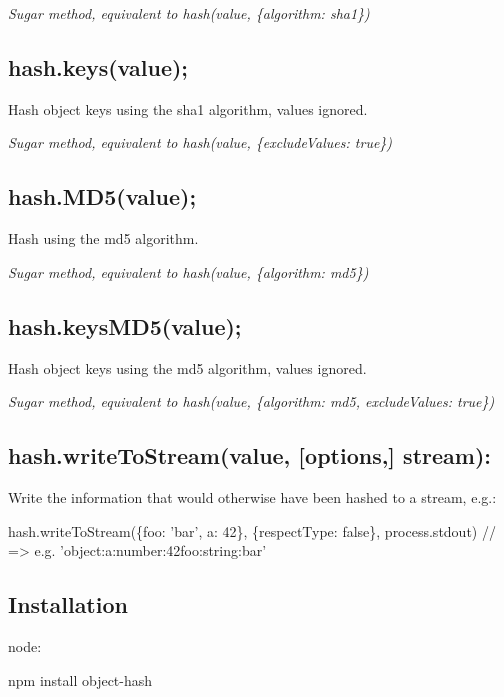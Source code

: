 {\itshape Sugar method, equivalent to hash(value, \{algorithm\+: \textquotesingle{}sha1\textquotesingle{}\})}

\subsection*{hash.\+keys(value);}

Hash object keys using the sha1 algorithm, values ignored.

{\itshape Sugar method, equivalent to hash(value, \{exclude\+Values\+: true\})}

\subsection*{hash.\+M\+D5(value);}

Hash using the md5 algorithm.

{\itshape Sugar method, equivalent to hash(value, \{algorithm\+: \textquotesingle{}md5\textquotesingle{}\})}

\subsection*{hash.\+keys\+M\+D5(value);}

Hash object keys using the md5 algorithm, values ignored.

{\itshape Sugar method, equivalent to hash(value, \{algorithm\+: \textquotesingle{}md5\textquotesingle{}, exclude\+Values\+: true\})}

\subsection*{hash.\+write\+To\+Stream(value, \mbox{[}options,\mbox{]} stream)\+:}

Write the information that would otherwise have been hashed to a stream, e.\+g.\+: 
\begin{DoxyCode}
hash.writeToStream(\{foo: 'bar', a: 42\}, \{respectType: false\}, process.stdout)
// => e.g. 'object:a:number:42foo:string:bar'
\end{DoxyCode}


\subsection*{Installation}

node\+: 
\begin{DoxyCode}
npm install object-hash
\end{DoxyCode}


